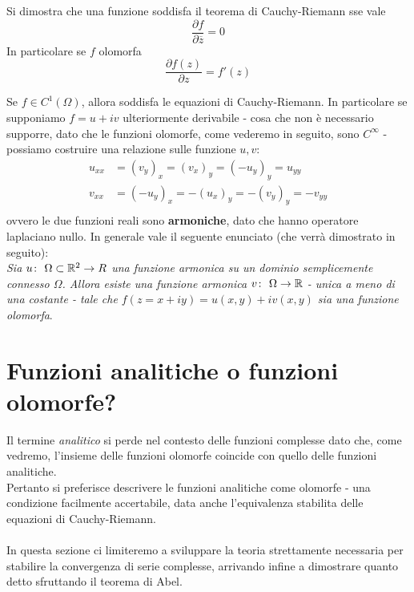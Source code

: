 \begin{remark}
	Si dimostra che una funzione soddisfa il teorema di Cauchy-Riemann sse vale 
	\begin{equation*}
		\frac{\partial f}{\partial \overline{z}} = 0
	\end{equation*}
	In particolare se $f$ olomorfa 
	\begin{equation*}
		\frac{\partial f(z)}{\partial z} = f'(z) 
	\end{equation*}
\end{remark}

\begin{remark}
	Se $f \in C^1(\Omega)$, allora soddisfa le equazioni di Cauchy-Riemann. In particolare se supponiamo $f = u+iv$ ulteriormente derivabile - cosa che non è necessario supporre, dato che le funzioni olomorfe, come vederemo in seguito, sono $C^\infty$ - possiamo costruire una relazione sulle funzione $u,v$:
	\begin{equation*}
	\begin{aligned}	
		u_{xx} & = (v_y)_x = (v_x)_y = (-u_y)_y = u_{yy} \\
		v_{xx} & = (-u_y)_x = -(u_x)_y = -(v_y)_y = -v_{yy}\\
	\end{aligned}
	\end{equation*}
	ovvero le due funzioni reali sono \textbf{armoniche}, dato che hanno operatore laplaciano nullo. In generale vale il seguente enunciato (che verrà dimostrato in seguito):\\
	
	\textit{Sia $u \colon\ \Omega \subset \mathbb{R}^2 \rightarrow R$ una funzione armonica su un dominio semplicemente connesso $\Omega$. Allora esiste una funzione armonica $v \colon\ \Omega \rightarrow \mathbb{R}$ - unica a meno di una costante - tale che $f(z=x+iy) = u(x,y) + iv(x,y)$ sia una funzione olomorfa}.
\end{remark}		
	
\section{Funzioni analitiche o funzioni olomorfe?}

Il termine \textit{analitico} si perde nel contesto delle funzioni complesse dato che, come vedremo, l'insieme delle funzioni olomorfe coincide con quello delle funzioni analitiche. \\ Pertanto si preferisce descrivere le funzioni analitiche come olomorfe - una condizione facilmente accertabile, data anche l'equivalenza stabilita delle equazioni di Cauchy-Riemann. \\ \\ In questa sezione ci limiteremo a sviluppare la teoria strettamente necessaria per stabilire la convergenza di serie complesse, arrivando infine a dimostrare quanto detto sfruttando il teorema di Abel.\\

